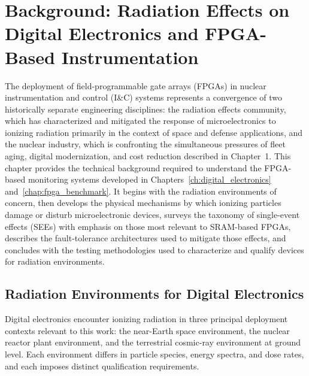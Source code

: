 
\chapter{Background: Radiation Effects on Digital Electronics and
         FPGA-Based Instrumentation}
\label{ch:FPGA_background}

The deployment of field-programmable gate arrays (FPGAs) in nuclear
instrumentation and control (I\&C) systems represents a convergence of
two historically separate engineering disciplines: the radiation effects
community, which has characterized and mitigated the response of
microelectronics to ionizing radiation primarily in the context of
space and defense applications, and the nuclear industry, which is
confronting the simultaneous pressures of fleet aging, digital
modernization, and cost reduction described in Chapter~1.
This chapter provides the technical background required to understand
the FPGA-based monitoring systems developed in Chapters~\ref{ch:digital_electronics} and~\ref{chap:fpga_benchmark}.
It begins with the radiation environments of concern, then develops the
physical mechanisms by which ionizing particles damage or disturb
microelectronic devices, surveys the taxonomy of single-event effects
(SEEs) with emphasis on those most relevant to SRAM-based FPGAs, describes
the fault-tolerance architectures used to mitigate those effects, and
concludes with the testing methodologies used to characterize and qualify
devices for radiation environments.

\section{Radiation Environments for Digital Electronics}
\label{sec:rad_environments}

Digital electronics encounter ionizing radiation in three principal
deployment contexts relevant to this work: the near-Earth space
environment, the nuclear reactor plant environment, and the terrestrial
cosmic-ray environment at ground level.  Each environment differs in
particle species, energy spectra, and dose rates, and each imposes
distinct qualification requirements.

